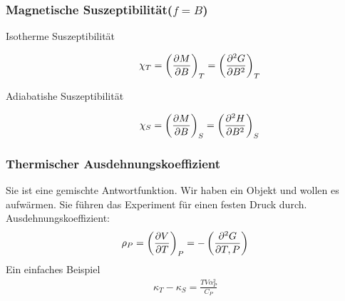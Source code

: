 \subsubsection*{Magnetische Suszeptibilität($f = B$)  }
\begin{description}
  \item[Isotherme Suszeptibilität]  
    \begin{align*}
      \chi_T = \left( \frac{\partial M }{\partial B} \right)_T= \left( \frac{\partial ^2 G }{\partial B^2} \right)_T
    \end{align*}
  \item[Adiabatishe Suszeptibilität]
    \begin{align*}
      \chi_S = \left( \frac{\partial M }{\partial B} \right)_S = \left( \frac{\partial ^2 H }{\partial B^2} \right)_S
    \end{align*}
\end{description}
\subsubsection*{Thermischer Ausdehnungskoeffizient}
Sie ist eine gemischte Antwortfunktion.
Wir haben ein Objekt und wollen es aufwärmen. Sie führen das Experiment für einen
festen Druck durch. 
%
Ausdehnungskoeffizient:
\begin{align*}
  \rho_P = \left( \frac{\partial V }{\partial T} \right)_P = - \left( \frac{\partial ^2 G }{\partial T, P} \right)
\end{align*}
%
Ein einfaches Beispiel
%
\begin{align*}
  \kappa_T - \kappa_S =\frac{ T V \alpha_P^2}{C_P}
\end{align*}
%


